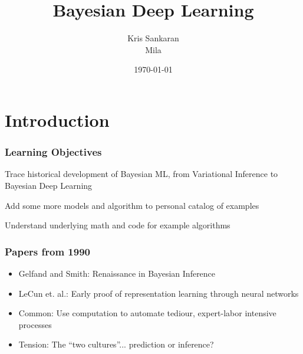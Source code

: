 \documentclass[10pt,mathserif]{beamer}
\title{\large \bfseries Bayesian Deep Learning}
\author{Kris Sankaran\\[3ex] Mila}
\date{\today}
\begin{document}
\section{Introduction}
\label{sec:introduction}

\begin{frame}
  \frametitle{Learning Objectives}
 \item Trace historical development of Bayesian ML, from Variational Inference
   to Bayesian Deep Learning
 \item Add some more models and algorithm to personal catalog of examples
 \item Understand underlying math and code for example algorithms
\end{frame}

\begin{frame}
  \frametitle{Papers from 1990}
  \begin{itemize}
  \item Gelfand and Smith: Renaissance in Bayesian Inference
  \item LeCun et. al.: Early proof of representation learning through neural networks
  \item Common: Use computation to automate tediour, expert-labor intensive processes
  \item Tension: The ``two cultures''... prediction or inference?
  \end{itemize}
  \begin{figure}
  \end{figure}
\end{frame}
\end{document}
